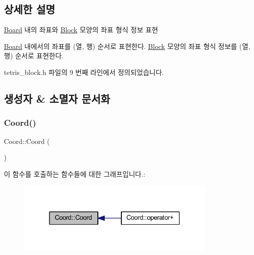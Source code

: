 \subsection{상세한 설명}
\mbox{\hyperlink{class_board}{Board}} 내의 좌표와 \mbox{\hyperlink{class_block}{Block}} 모양의 좌표 형식 정보 표현 

\mbox{\hyperlink{class_board}{Board}} 내에서의 좌표를 (열, 행) 순서로 표현한다. \mbox{\hyperlink{class_block}{Block}} 모양의 좌표 형식 정보를 (열, 행) 순서로 표현한다. 

tetris\+\_\+block.\+h 파일의 9 번째 라인에서 정의되었습니다.



\subsection{생성자 \& 소멸자 문서화}
\mbox{\label{struct_coord_a46e518631fa539ebb8a7f2a5b59fd483}} 
\subsubsection{\texorpdfstring{Coord()}{Coord()}\hspace{0.1cm}{\footnotesize\ttfamily [1/2]}}
{\footnotesize\ttfamily Coord\+::\+Coord (\begin{DoxyParamCaption}{ }\end{DoxyParamCaption})\hspace{0.3cm}{\ttfamily [delete]}}

이 함수를 호출하는 함수들에 대한 그래프입니다.\+:
\nopagebreak
\begin{figure}[H]
\begin{center}
\leavevmode
\includegraphics[width=279pt]{struct_coord_a46e518631fa539ebb8a7f2a5b59fd483_icgraph}
\end{center}
\end{figure}
\mbox{\label{struct_coord_ab01ff8e569cc417d7c669007e12a5fa1}} 
